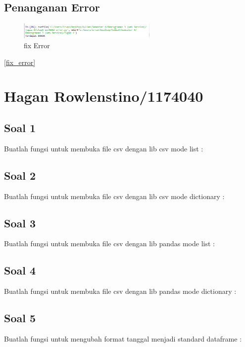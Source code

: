 	\subsection{Penanganan Error}
		
		\begin{figure} [ht]
			\centerline{\includegraphics[width=0.6\textwidth]{figures/4/1174043/Praktek/fix_error.png}}
			\caption{fix Error}
			\label{fix Error}
		\end{figure}

		\ref{fix_error}

\section{Hagan Rowlenstino/1174040}
\subsection{Soal 1}
Buatlah fungsi untuk membuka file csv dengan lib csv mode list : 


\subsection{Soal 2}
Buatlah fungsi untuk membuka file csv dengan lib csv mode dictionary : 


\subsection{Soal 3}
Buatlah fungsi  untuk membuka file csv dengan lib pandas mode list : 


\subsection{Soal 4}
Buatlah fungsi  untuk membuka file csv dengan lib pandas mode dictionary : 


\subsection{Soal 5}
Buatlah fungsi untuk mengubah format tanggal menjadi standard dataframe : 


